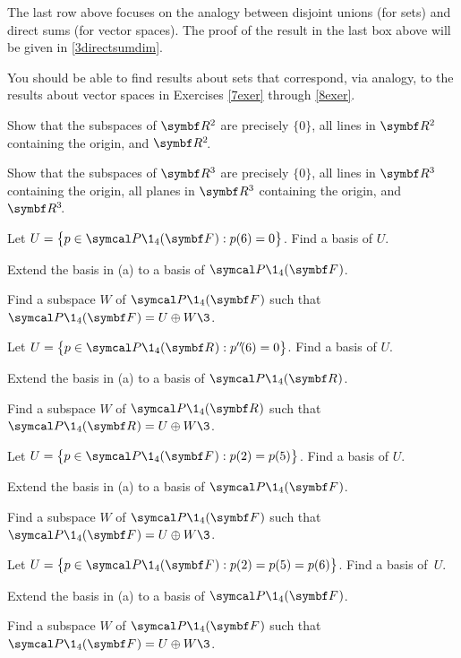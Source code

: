 \smallskip

The last row above focuses on the analogy between disjoint unions (for sets) and direct sums (for vector spaces). The proof of the result in the last box above will be given in \ref{3directsumdim}.

You should be able to find results about sets that correspond, via analogy, to the results about vector spaces in Exercises \ref{7exer} through \ref{8exer}.

\begin{exercises}

\exercise
Show that the subspaces of $\R{2}$ are precisely $\{0\}$, all lines in $\R{2}$ containing the origin, and $\RR{2}$.


\exercise
Show that the subspaces of $\R{3}$ are precisely $\{0\}$, all lines in $\R{3}$ containing the origin, all planes in $\R{3}$ containing the origin, and $\RR{3}$.


\exercise
\begin{SUBtheorem}
\item
Let $U = \br[\big]{p \in \P\1_4(\F{}): p(6) = 0}$. Find a basis of $U$.
\item
Extend the basis in (a) to a basis of $\P\1_4(\F{})$.
\item
Find a subspace $W$ of $\P\1_4(\F{})$ such that $\P\1_4(\F{}) = U \oplus W\3$.
\end{SUBtheorem}


\exercise
\begin{SUBtheorem}
\item
Let $U = \br[\big]{p \in \P\1_4(\R{}): p'' \! (6) = 0}$. Find a basis of $U$.
\item
Extend the basis in (a) to a basis of $\P\1_4(\R{})$.
\item
Find a subspace $W$ of $\P\1_4(\R{})$ such that $\P\1_4(\R{}) = U \oplus W\3$.
\end{SUBtheorem}


\exercise \label{2basis}
\begin{SUBtheorem}
\item
Let $U = \br[\big]{p \in \P\1_4(\F{}): p(2) = p(5)}$. Find a basis of $U$.
\item
Extend the basis in (a) to a basis of $\P\1_4(\F{})$.
\item
Find a subspace $W$ of $\P\1_4(\F{})$ such that $\P\1_4(\F{}) = U \oplus W\3$.
\end{SUBtheorem}


\exercise
\begin{SUBtheorem}
\item
Let $U = \br[\big]{p \in \P\1_4(\F{}): p(2) = p(5) = p(6)}$. Find a basis of~$U$.
\item
Extend the basis in (a) to a basis of $\P\1_4(\F{})$.
\item
Find a subspace $W$ of $\P\1_4(\F{})$ such that $\P\1_4(\F{}) = U \oplus W\3$.
\end{SUBtheorem}



\end{exercises}
